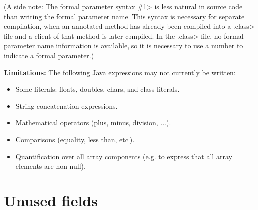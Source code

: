 
(A side note:  The formal parameter syntax \<\#1> is less natural in source code
than writing the formal parameter name.  This syntax is necessary for
separate compilation, when an annotated method has already been compiled
into a \<.class> file and a client of that method is later compiled.
In the \<.class> file, no formal parameter name information is available,
so it is necessary to use a number to indicate a formal parameter.)


\textbf{Limitations:}
The following Java expressions may not currently be written:
\begin{itemize}
\item Some literals:  floats, doubles, chars, and class literals.
\item String concatenation expressions.
\item Mathematical operators (plus, minus, division, ...).
\item Comparisons (equality, less than, etc.).
\item Quantification over all array components (e.g. to express that all
  array elements are non-null).
\end{itemize}



\section{Unused fields\label{unused-fields}}

